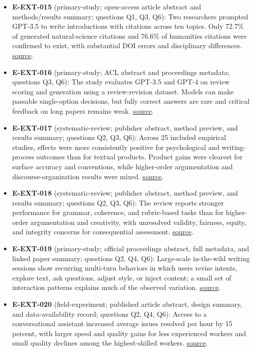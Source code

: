 \documentclass[11pt]{article}
\begin{document}
\begin{itemize}
\item
  \textbf{E-EXT-015} (primary-study; open-access article abstract and methods/results summary; questions Q1, Q3, Q6): Two researchers prompted GPT-3.5 to write introductions with citations across ten topics. Only 72.7\% of generated natural-science citations and 76.6\% of humanities citations were confirmed to exist, with substantial DOI errors and disciplinary differences. \href{https://www.jmir.org/2024/1/e52935/}{source}.
\item
  \textbf{E-EXT-016} (primary-study; ACL abstract and proceedings metadata; questions Q3, Q6): The study evaluates GPT-3.5 and GPT-4 on review scoring and generation using a review-revision dataset. Models can make passable single-option decisions, but fully correct answers are rare and critical feedback on long papers remains weak. \href{https://aclanthology.org/2024.lrec-main.816/}{source}.
\item
  \textbf{E-EXT-017} (systematic-review; publisher abstract, method preview, and results summary; questions Q2, Q3, Q6): Across 25 included empirical studies, effects were more consistently positive for psychological and writing-process outcomes than for textual products. Product gains were clearest for surface accuracy and conventions, while higher-order argumentation and discourse-organization results were mixed. \href{https://www.sciencedirect.com/science/article/pii/S1475158526000986}{source}.
\item
  \textbf{E-EXT-018} (systematic-review; publisher abstract, method preview, and results summary; questions Q2, Q3, Q6): The review reports stronger performance for grammar, coherence, and rubric-based tasks than for higher-order argumentation and creativity, with unresolved validity, fairness, equity, and integrity concerns for consequential assessment. \href{https://www.sciencedirect.com/science/article/pii/S1075293526000292}{source}.
\item
  \textbf{E-EXT-019} (primary-study; official proceedings abstract, full metadata, and linked paper summary; questions Q2, Q4, Q6): Large-scale in-the-wild writing sessions show recurring multi-turn behaviors in which users revise intents, explore text, ask questions, adjust style, or inject content; a small set of interaction patterns explains much of the observed variation. \href{https://aclanthology.org/2025.emnlp-main.852/}{source}.
\item
  \textbf{E-EXT-020} (field-experiment; published article abstract, design summary, and data-availability record; questions Q2, Q4, Q6): Access to a conversational assistant increased average issues resolved per hour by 15 percent, with larger speed and quality gains for less experienced workers and small quality declines among the highest-skilled workers. \href{https://academic.oup.com/qje/article/140/2/889/7990658}{source}.

\end{itemize}
\end{document}
